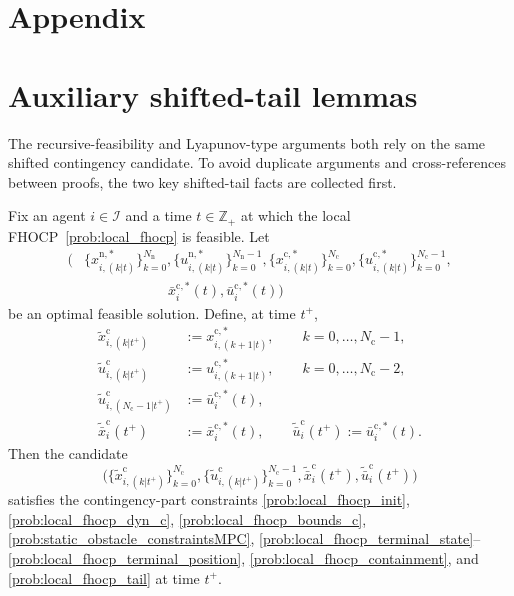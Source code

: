 \documentclass[twocolumn]{autart}
\begin{document}

\appendix
{}

\makeatletter
\renewcommand\@seccntformat[1]{%
  \csname the#1\endcsname.\quad
}
\makeatother
\section*{Appendix}
\section{Auxiliary shifted-tail lemmas}

The recursive-feasibility and Lyapunov-type arguments both rely on the same shifted contingency candidate. To avoid duplicate arguments and cross-references between proofs, the two key shifted-tail facts are collected first.

\begin{lemma}
\label{lem:appendix_shifted_candidate_feasible}
Fix an agent $i\in\mathcal I$ and a time $t\in\mathbb Z_+$ at which the local FHOCP~\eqref{prob:local_fhocp} is feasible. Let
\begin{align*}
\Big(
&\{x_{i,(k|t)}^{\mathrm n,\ast}\}_{k=0}^{N_{\mathrm n}},
\{u_{i,(k|t)}^{\mathrm n,\ast}\}_{k=0}^{N_{\mathrm n}-1},
\{x_{i,(k|t)}^{\mathrm c,\ast}\}_{k=0}^{N_{\mathrm c}},
\{u_{i,(k|t)}^{\mathrm c,\ast}\}_{k=0}^{N_{\mathrm c}-1},\\
&\qquad \qquad \qquad \bar x_i^{\mathrm c,\ast}(t),
\bar u_i^{\mathrm c,\ast}(t)
\Big)
\end{align*}
be an optimal feasible solution. Define, at time $t^+$,
\begin{align}
\tilde x_{i,(k|t^+)}^{\mathrm c}
&:=x_{i,(k+1|t)}^{\mathrm c,\ast},
\qquad k=0,\dots,N_{\mathrm c}-1,
\label{eq:app_shift_x}
\\
\tilde u_{i,(k|t^+)}^{\mathrm c}
&:=u_{i,(k+1|t)}^{\mathrm c,\ast},
\qquad k=0,\dots,N_{\mathrm c}-2,
\label{eq:app_shift_u}
\\
\tilde u_{i,(N_{\mathrm c}-1|t^+)}^{\mathrm c}
&:=\bar u_i^{\mathrm c,\ast}(t),
\label{eq:app_shift_u_terminal}
\\
\tilde{\bar x}_i^{\mathrm c}(t^+)
&:=\bar x_i^{\mathrm c,\ast}(t),
\qquad
\tilde{\bar u}_i^{\mathrm c}(t^+):=\bar u_i^{\mathrm c,\ast}(t).
\label{eq:app_shift_bar}
\end{align}
Then the candidate
\[
\Big(
\{\tilde x_{i,(k|t^+)}^{\mathrm c}\}_{k=0}^{N_{\mathrm c}},
\{\tilde u_{i,(k|t^+)}^{\mathrm c}\}_{k=0}^{N_{\mathrm c}-1},
\tilde{\bar x}_i^{\mathrm c}(t^+),
\tilde{\bar u}_i^{\mathrm c}(t^+)
\Big)
\]
satisfies the contingency-part constraints
\eqref{prob:local_fhocp_init},
\eqref{prob:local_fhocp_dyn_c},
\eqref{prob:local_fhocp_bounds_c},
\eqref{prob:static_obstacle_constraintsMPC},
\eqref{prob:local_fhocp_terminal_state}--\eqref{prob:local_fhocp_terminal_position},
\eqref{prob:local_fhocp_containment},
and \eqref{prob:local_fhocp_tail} at time $t^+$.
\end{lemma}
\end{document}
